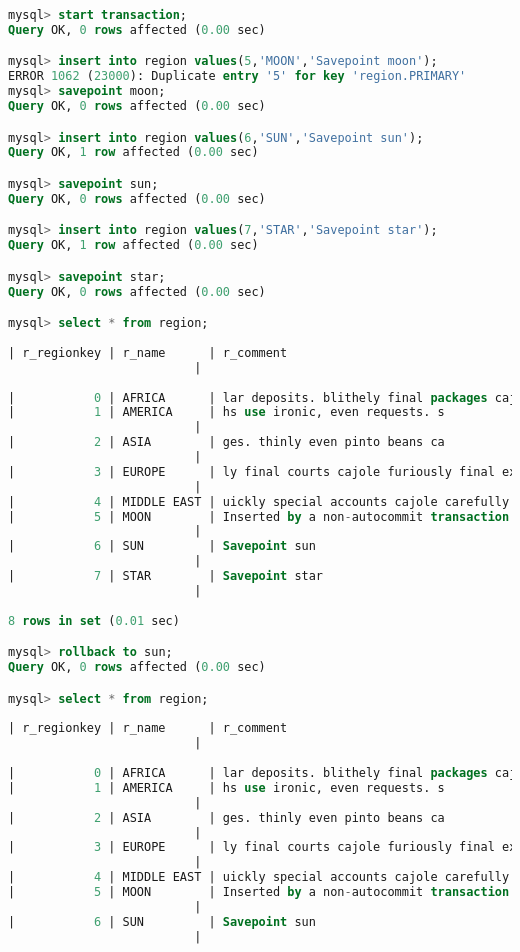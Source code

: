\documentclass{article}
\begin{document}
\begin{lstlisting}[language=sql]
mysql> start transaction;
Query OK, 0 rows affected (0.00 sec)

mysql> insert into region values(5,'MOON','Savepoint moon');
ERROR 1062 (23000): Duplicate entry '5' for key 'region.PRIMARY'
mysql> savepoint moon;
Query OK, 0 rows affected (0.00 sec)

mysql> insert into region values(6,'SUN','Savepoint sun');
Query OK, 1 row affected (0.00 sec)

mysql> savepoint sun;
Query OK, 0 rows affected (0.00 sec)

mysql> insert into region values(7,'STAR','Savepoint star');
Query OK, 1 row affected (0.00 sec)

mysql> savepoint star;
Query OK, 0 rows affected (0.00 sec)

mysql> select * from region;
   
| r_regionkey | r_name      | r_comment
                          |
   
|           0 | AFRICA      | lar deposits. blithely final packages cajole. regular waters are final requests. regular accounts are according to  |
|           1 | AMERICA     | hs use ironic, even requests. s
                          |
|           2 | ASIA        | ges. thinly even pinto beans ca
                          |
|           3 | EUROPE      | ly final courts cajole furiously final excuse
                          |
|           4 | MIDDLE EAST | uickly special accounts cajole carefully blithely close requests. carefully final asymptotes haggle furiousl        |
|           5 | MOON        | Inserted by a non-autocommit transaction.
                          |
|           6 | SUN         | Savepoint sun
                          |
|           7 | STAR        | Savepoint star
                          |
   
8 rows in set (0.01 sec)

mysql> rollback to sun;
Query OK, 0 rows affected (0.00 sec)

mysql> select * from region;
   
| r_regionkey | r_name      | r_comment
                          |
   
|           0 | AFRICA      | lar deposits. blithely final packages cajole. regular waters are final requests. regular accounts are according to  |
|           1 | AMERICA     | hs use ironic, even requests. s
                          |
|           2 | ASIA        | ges. thinly even pinto beans ca
                          |
|           3 | EUROPE      | ly final courts cajole furiously final excuse
                          |
|           4 | MIDDLE EAST | uickly special accounts cajole carefully blithely close requests. carefully final asymptotes haggle furiousl        |
|           5 | MOON        | Inserted by a non-autocommit transaction.
                          |
|           6 | SUN         | Savepoint sun
                          |
   

\end{lstlisting}
\end{document}
